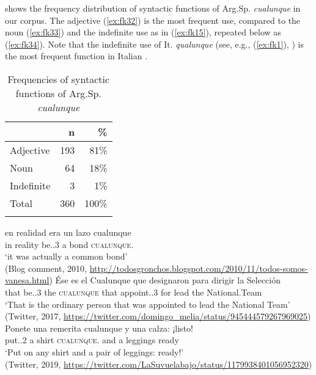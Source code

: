 \documentclass[output=paper,colorlinks,citecolor=brown]{langscibook}
\begin{document}
 shows the frequency distribution of syntactic functions of Arg.Sp. \textit{cualunque} in our corpus. The adjective (\ref{ex:fk32}) is the most frequent use, compared to the noun (\ref{ex:fk33}) and the indefinite use as in (\ref{ex:fk15}), repeated below as (\ref{ex:fk34}). Note that the indefinite use of It. \textit{qualunque} (see, e.g., (\ref{ex:fk1}),  ) is the most frequent function in Italian \citep{Kellert2021a}.\pagebreak

\begin{table}
    \begin{tabular}{lrr}
    \lsptoprule
         & n & \% \\
        \midrule
        Adjective & 193 & 81\%\\
        Noun & 64 & 18\%\\
        Indefinite & 3 & 1\%\\
        \midrule
        Total & 360 & 100\% \\
        \lspbottomrule
    \end{tabular}
    \caption{Frequencies of syntactic functions of Arg.Sp. \textit{cualunque}}
    \label{tab:fk2}
\end{table}

\ea\label{ex:fk32}
    \gll en realidad era un lazo cualunque\\
    in reality {be.\IPFV.3\SG} a bond \textsc{cualunque.\SG}\\
    \glt ‘it was actually a common bond’\\
    (Blog comment, 2010, \url{http://todosgronchos.blogspot.com/2010/11/todos-somos-vanesa.html})
\ex \label{ex:fk33} 
    \gll Ése es el Cualunque que designaron para dirigir la Selección\\
    that {be.\PRS.3\SG} the \textsc{cualunque} that {appoint.\PFV.3\PL} for lead the National.Team\\
    \glt ‘That is the ordinary person that was appointed to lead the National Team’\\
    (Twitter, 2017, \url{https://twitter.com/domingo_melia/status/945444579267969025})
\ex \label{ex:fk34} 
    \gll Ponete una remerita cualunque y una calza: ¡listo!\\
    {put.\IMP.2\SG} a shirt \textsc{cualunque.\SG} and a leggings ready\\
    \glt ‘Put on any shirt and a pair of leggings: ready!’\\
    (Twitter, 2019, \url{https://twitter.com/LaSuvuelabajo/status/1179938401056952320})
\z
\end{document}
